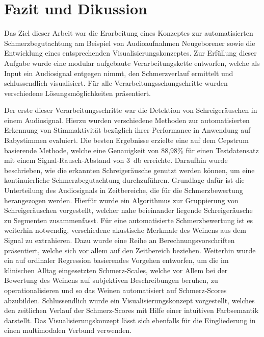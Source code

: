 \chapter{Fazit und Dikussion}

Das Ziel dieser Arbeit war die Erarbeitung eines Konzeptes zur automatisierten Schmerzbegutachtung am Beispiel von Audioaufnahmen Neugeborener sowie die Entwicklung eines entsprechenden Visualisierungskonzeptes. Zur Erfüllung dieser Aufgabe wurde eine modular aufgebaute Verarbeitungskette entworfen, welche als Input ein Audiosignal entgegen nimmt, den Schmerzverlauf ermittelt und schlussendlich visualisiert. Für alle Verarbeitungsschungschritte wurden verschiedene Lösungsmöglichkeiten präsentiert.

Der erste dieser Verarbeitungsschritte war die Detektion von Schreigeräuschen in einem Audiosignal. Hierzu wurden verschiedene Methoden zur automatisierten Erkennung von Stimmaktivität bezüglich ihrer Performance in Anwendung auf Babystimmen evaluiert. Die besten Ergebnisse erzielte eine auf dem Cepstrum basierende Methode, welche eine Genauigkeit von 88,98\% für einen Testdatensatz mit einem Signal-Rausch-Abstand von \SI{3}{\decibel} erreichte. Daraufhin wurde beschrieben, wie die erkannten Schreigeräusche genutzt werden können, um eine kontinuierliche Schmerzbegutachtung durchzuführen. Grundlage dafür ist die Unterteilung des Audiosignals in Zeitbereiche, die für die Schmerzbewertung herangezogen werden. Hierfür wurde ein Algorithmus zur Gruppierung von Schreigeräuschen vorgestellt, welcher nahe beieinander liegende Schreigeräusche zu Segmenten zusammenfasst. Für eine automatisierte Schmerzbewertung ist es weiterhin notwendig, verschiedene akustische Merkmale des Weinens aus dem Signal zu extrahieren. Dazu wurde eine Reihe an Berechnungsvorschriften präsentiert, welche sich vor allem auf den Zeitbereich beziehen. Weiterhin wurde ein auf ordinaler Regression basierendes Vorgehen entworfen, um die im klinischen Alltag eingesetzten Schmerz-Scales, welche vor Allem bei der Bewertung des Weinens auf subjektiven Beschreibungen beruhen, zu operationalisieren und so das Weinen automatisiert auf Schmerz-Scores abzubilden. Schlussendlich wurde ein Visualisierungskonzept vorgestellt, welches den zeitlichen Verlauf der Schmerz-Scores mit Hilfe einer intuitiven Farbsemantik darstellt. Das Visualisierungskonzept lässt sich ebenfalls für die Eingliederung in einen multimodalen Verbund verwenden.

